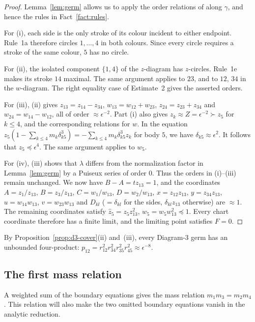 \documentclass[Threeside,11pt]{article}
\theoremstyle{definition}
\theoremstyle{remark}
\numberwithin{equation}{section}
\theoremstyle{remark}
\begin{document}
\begin{proof}
{Lemma~\ref{lem:germ} allows us to apply the order relations of \cite[\S3]{AK}
along $\gamma$, and hence the rules in Fact~\ref{fact:rules}.

For (i), each side is the only stroke of its colour incident to either endpoint.
Rule~1a \cite[pp.~545--546]{AK} therefore circles $1,\dots,4$ in both colours.
Since every circle requires a stroke of the same colour, $5$ has no circle.

For (ii), the isolated component $\{1,4\}$ of the $z$-diagram has $z$-circles.
Rule~1e \cite[p.~546]{AK} makes its stroke $14$ maximal. The same argument applies to $23$,
and to $12$, $34$ in the $w$-diagram. The right equality case of Estimate~2
\cite[p.~548]{AK} gives the asserted orders.

For (iii), (ii) gives $z_{13}=z_{14}-z_{34}$, $w_{13}=w_{12}+w_{23}$, $z_{24}=z_{23}+z_{34}$ and
$w_{24}=w_{14}-w_{12}$, all of order $\approx\epsilon^{-2}$.
Part (i) also gives $z_k\approx Z=\epsilon^{-2}\succ z_5$ for $k\le4$, and the corresponding
relations for $w$. In the equation
$z_5(1-\sum_{k\le4}m_k\delta_{k5}^3)=-\sum_{k\le4}m_k\delta_{k5}^3z_k$ for body $5$,
we have $\delta_{k5}\approx\epsilon^2$. It follows that $z_5\preccurlyeq\epsilon^4$.
The same argument applies to $w_5$.

For (iv), (iii) shows that $\lambda$ differs from the normalization factor in
Lemma~\ref{lem:germ} by a Puiseux series of order $0$. Thus the orders in (i)--(iii) remain
unchanged. We now have $B-A=tz_{13}=1$, and the coordinates $A=z_1/z_{13}$, $B=z_3/z_{13}$,
$C=w_1/w_{13}$, $D=w_2/w_{13}$, $x=z_{12}z_{13}$, $y=z_{34}z_{13}$, $u=w_{14}w_{13}$,
$v=w_{23}w_{13}$ and $D_{kl}$ ($=\delta_{kl}$ for the sides, $\delta_{kl}z_{13}$ otherwise) are
$\approx1$. The remaining coordinates satisfy $\hat z_5=z_5z_{13}^2$,
$\hat w_5=w_5w_{13}^2\preccurlyeq1$. Every chart coordinate therefore has a finite limit,
and the limiting point satisfies $F=0$.}
\end{proof}

By Proposition~\ref{prop:d3-cover}(ii) and~(iii), every Diagram-3 germ has an unbounded
four-product: $p_{12}=r_{12}^2r_{34}^2r_{35}^2r_{45}^2\approx\epsilon^{-8}$.

\subsection{The first mass relation}

A weighted sum of the boundary equations gives the mass relation
$m_1m_3=m_2m_4$. This relation will also make the two omitted boundary equations
vanish in the analytic reduction.
\end{document}
